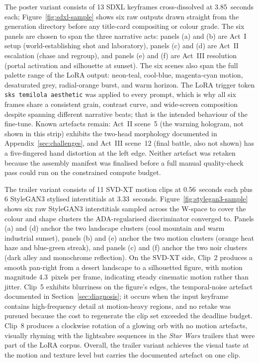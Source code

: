 \documentclass{article}
\begin{document}
The poster variant consists of 13 SDXL keyframes cross-dissolved at 3.85~seconds each; Figure~\ref{fig:sdxl-sample} shows six raw outputs drawn straight from the generation directory before any title-card compositing or colour grade. The six panels are chosen to span the three narrative acts: panels (a) and (b) are Act~I setup (world-establishing shot and laboratory), panels (c) and (d) are Act~II escalation (chase and regroup), and panels (e) and (f) are Act~III resolution (portal activation and silhouette at sunset). The six scenes also span the full palette range of the LoRA output: neon-teal, cool-blue, magenta-cyan motion, desaturated grey, radial-orange burst, and warm horizon. The LoRA trigger token \verb|sks temilola aesthetic| was applied to every prompt, which is why all six frames share a consistent grain, contrast curve, and wide-screen composition despite spanning different narrative beats; that is the intended behaviour of the fine-tune. Known artefacts remain: Act~II scene~5 (the warning hologram, not shown in this strip) exhibits the two-head morphology documented in Appendix~\ref{sec:challenges}, and Act~III scene~12 (final battle, also not shown) has a five-fingered hand distortion at the left edge. Neither artefact was retaken because the assembly manifest was finalised before a full manual quality-check pass could run on the constrained compute budget.

The trailer variant consists of 11 SVD-XT motion clips at 0.56~seconds each plus 6 StyleGAN3 stylised interstitials at 3.33~seconds. Figure~\ref{fig:stylegan3-sample} shows six raw StyleGAN3 interstitials sampled across the W-space to cover the colour and shape clusters the ADA-regularised discriminator converged to. Panels (a) and (d) anchor the two landscape clusters (cool mountain and warm industrial sunset), panels (b) and (e) anchor the two motion clusters (orange heat haze and blue-green streak), and panels (c) and (f) anchor the two noir clusters (dark alley and monochrome reflection). On the SVD-XT side, Clip~2 produces a smooth pan-right from a desert landscape to a silhouetted figure, with motion magnitude 4.3~pixels per frame, indicating steady cinematic motion rather than jitter. Clip~5 exhibits blurriness on the figure's edges, the temporal-noise artefact documented in Section~\ref{sec:diagnosis}; it occurs when the input keyframe contains high-frequency detail at motion-heavy regions, and no retake was pursued because the cost to regenerate the clip set exceeded the deadline budget. Clip~8 produces a clockwise rotation of a glowing orb with no motion artefacts, visually rhyming with the lightsabre sequences in the \emph{Star Wars} trailers that were part of the LoRA corpus. Overall, the trailer variant achieves the visual taste at the motion and texture level but carries the documented artefact on one clip.
\end{document}
